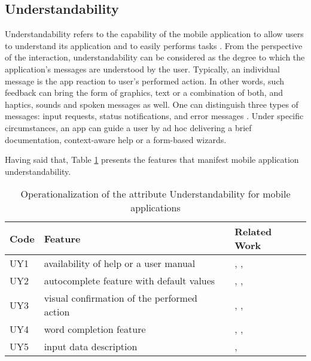 \documentclass[preprint,12pt]{elsarticle}
\begin{document}
\subsection{Understandability} %
Understandability refers to the capability of the mobile application to allow users to understand its application and to easily performs tasks \cite{ammar2019usability}. From the perspective of the interaction, understandability can be considered as the degree to which the application's messages are understood by the user. Typically, an individual message is the app reaction to user's performed action. In other words, such feedback can bring the form of graphics, text or a combination of both, and haptics, sounds and spoken messages as well. One can distinguish  three types of messages: input requests, status notifications, and error messages \cite{pfister2011affective}. 
Under specific circumstances, an app can guide a user by ad hoc delivering a brief documentation, context-aware help or a form-based wizards. 

Having said that, Table \ref{tab:oper-understand} presents the features that manifest mobile application understandability.

\begin{table}[h]
\caption{Operationalization of the attribute Understandability for mobile applications}
\label{tab:oper-understand}
\footnotesize
\begin{tabular}{|l|p{9cm}|p{2.5cm}|}
\hline
\textbf{Code}  & \textbf{Feature}  & \textbf{Related Work} \\ \hline
UY1 & availability of help or a user manual    & \cite{ahmad2021spiritual}, \cite{afrin2022usability}, \cite{castilla2023digital}  \\ \hline
UY2 & autocomplete feature with default values  &  \cite{chang2013improving}, \cite{piplani2018ict}, \cite{holstrom2020effects}      \\ \hline
UY3 & visual confirmation of the performed action  &  \cite{goumopoulos2017development}, \cite{perez2020evaluation}, \cite{tovide2022signsupport}     \\ \hline
UY4 & word completion feature  & \cite{agosti2003managing}, \cite{chittaro2007mobile}, \cite{bilal2018analyzing}   \\ \hline
UY5 & input data description  &  \cite{liang2017mobile}, \cite{ali2022mobile}    \\ \hline
\end{tabular}
\end{table}
\end{document}
